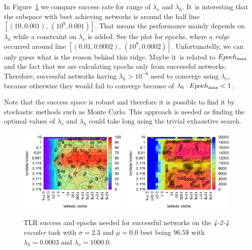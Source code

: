 In Figure~\ref{fig:results-tlr-auto4-performance} we compare success rate for range of $\lambda_v$ and $\lambda_h$. It~is interesting that the subspace with best achieving networks is around the half line $[(10, 0.001),\,(10^9, 0.001)]$. That means the performance mainly depends on $\lambda_h$ while a constraint on $\lambda_v$ is added. See the plot for epochs, where a \emph{ridge} occurred around line $[(0.01, 0.0002),\,(10^9, 0.0002)]$. Unfortunatelly, we can only guess what is the reason behind this ridge. Maybe it~is related to $Epoch_{\rm max}$ and the fact that we are calculating epochs only from successful networks. Therefore, successful networks having $\lambda_h > 10^{-6}$ need to converge using $\lambda_v$, because otherwise they would fail to converge because of $\lambda_h \cdot Epoch_{\rm max} < 1$. 

Note that the success space is robust and therefore it is possible to find it by stochastic methods such as Monte Carlo. This approach is needed as finding the optimal values of $\lambda_v$ and $\lambda_h$ could take long using the trivial exhaustive search. 

\begin{figure}[H]
  \centering
  \includegraphics[width=0.49\textwidth]{img/tlr-auto4-success.pdf}   
  \includegraphics[width=0.49\textwidth]{img/tlr-auto4-epoch.pdf}     
  \caption{TLR success and epochs needed for successful networks on the \emph{4-2-4 encoder} task with $\sigma = 2.3$ and $\mu = 0.0$ best being $96.5\$$ with $\lambda_h=0.0003$ and $\lambda_v=1000.0$.}
  \label{fig:results-tlr-auto4-performance}
\end{figure}

